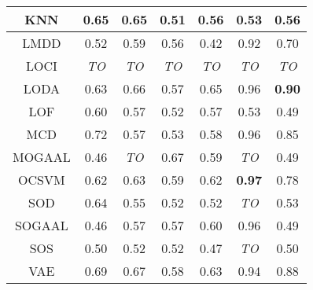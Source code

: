 \begin{table*}[!t]
\begin{tabular}{|c|c|c|c|c|c|c|}
\hline
                        KNN &                         0.65 &                    0.65 &                        0.51 &                        0.56 &                      0.53 &                      0.56 \\
\hline
                        LMDD &                         0.52 &                    0.59 &                        0.56 &                        0.42 &                      0.92 &                      0.70 \\
\hline
                        LOCI &                  \textit{TO} &             \textit{TO} &                 \textit{TO} &                 \textit{TO} &               \textit{TO} &               \textit{TO} \\
\hline
                        LODA &                         0.63 &                    0.66 &                        0.57 &                        0.65 &                      0.96 &             \textbf{0.90} \\
\hline
                        LOF &                         0.60 &                    0.57 &                        0.52 &                        0.57 &                      0.53 &                      0.49 \\
\hline
                        MCD &                         0.72 &                    0.57 &                        0.53 &                        0.58 &                      0.96 &                      0.85 \\
\hline
                        MOGAAL &                         0.46 &             \textit{TO} &                        0.67 &                        0.59 &               \textit{TO} &                      0.49 \\
\hline
                        OCSVM &                         0.62 &                    0.63 &                        0.59 &                        0.62 &             \textbf{0.97} &                      0.78 \\
\hline
                        SOD &                         0.64 &                    0.55 &                        0.52 &                        0.52 &               \textit{TO} &                      0.53 \\
\hline
                        SOGAAL &                         0.46 &                    0.57 &                        0.57 &                        0.60 &                      0.96 &                      0.49 \\
\hline
                        SOS &                         0.50 &                    0.52 &                        0.52 &                        0.47 &               \textit{TO} &                      0.50 \\
\hline
                        VAE &                         0.69 &                    0.67 &                        0.58 &                        0.63 &                      0.94 &                      0.88 \\
\hline
\end{tabular}
\end{table*}


